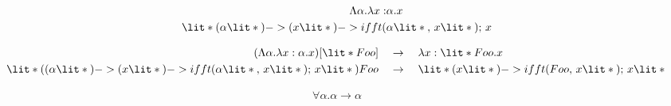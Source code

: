 \documentclass[11hpt]{article}
\begin{document}
\begin{align*}
\Lambda \alpha.\lambda x:&\alpha.x \\
\lit*{(} \alpha\lit*{) -> (}x\lit*{) -> ifft(} &\alpha \lit*{,\ }x\lit*{);}\ x
\end{align*}

\begin{align*}
(\Lambda\alpha.\lambda x:\alpha.x) [\lit*{Foo}] \quad &\to \quad \lambda x:\lit*{Foo}.x \\
\lit*{((}\alpha\lit*{) -> (}x\lit*{) -> ifft(} \alpha \lit*{,\ }x\lit*{); \ }x\lit*{) Foo} \quad &\to \quad \lit*{(}x\lit*{) -> ifft(Foo,\ }x\lit*{); \ }x\lit*{}
\end{align*}

\begin{align*}
\forall\alpha.\alpha \to \alpha
\end{align*}
\end{document}
